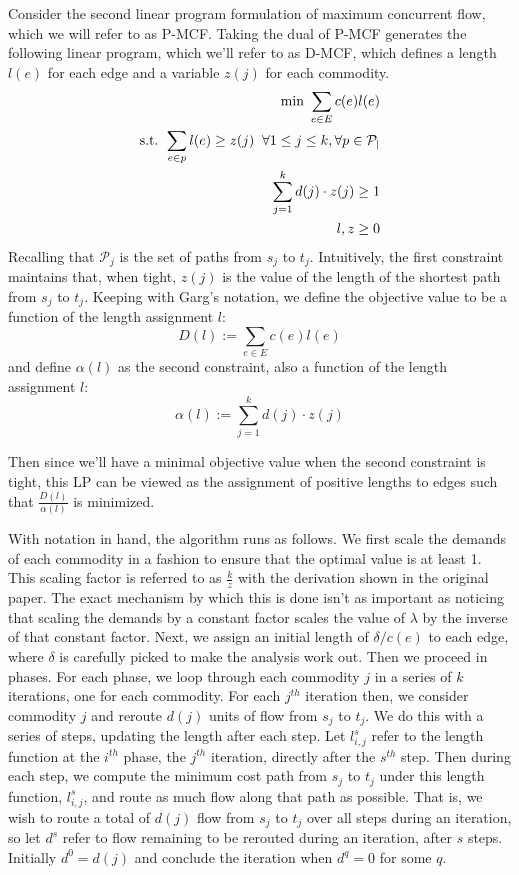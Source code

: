 Consider the second linear program formulation of maximum
concurrent flow, which we will refer to as P-MCF. Taking the dual of
P-MCF generates the following linear program, which we'll refer to as D-MCF, which defines a length
$l(e)$ for each edge and a variable $z(j)$ for each commodity.
\begin{align*}
\text{min     } \sum_{e\in E}c(e)l(e) \\
\text{s.t. }\sum_{e\in p}l(e) \geq z(j) \;\;\forall 1\leq j \leq k,
\forall p \in \cal{P}_j\\
\sum_{j=1}^kd(j)\cdot z(j)\geq 1\\
l,z\geq 0
\end{align*}
Recalling that $\mathcal{P}_j$ is the set of paths from $s_j$ to
$t_j$. Intuitively, the first constraint maintains that, when tight, $z(j)$ is the
value of the length of the shortest path from $s_j$ to $t_j$. Keeping
with Garg's notation, we define the objective value to be a function
of the length assignment $l$:
$$D(l) := \sum_{e\in E} c(e)l(e)$$
and define $\alpha(l)$ as the second constraint, also a function of the length assignment $l$:
$$\alpha(l) := \sum_{j=1}^k d(j)\cdot z(j)$$

Then since we'll have a minimal objective value when the second
constraint is tight, this LP can be viewed as the assignment of
positive lengths to edges such that $\frac{D(l)}{\alpha(l)}$ is
minimized. 

With notation in hand, the algorithm runs as follows. We first scale
the demands of each commodity in a fashion to ensure that the optimal
value is at least 1. This scaling factor is referred to as
$\frac{k}{z}$ with the derivation shown in the original paper. The exact mechanism by which this is done isn't
as important as noticing that scaling the demands by a constant factor
scales the value of $\lambda$ by the inverse of that constant
factor. Next, we assign
an initial length of $\delta/c(e)$ to each edge, where $\delta$ is carefully picked
to make the analysis work out. Then we proceed in phases. For each
phase, we loop through each commodity $j$ in a series of $k$
iterations, one for each commodity. For each $j^{th}$ iteration then, we
consider commodity $j$ and reroute $d(j)$ units of flow from $s_j$ to
$t_j$. We do this with a series of steps, updating the length after each step. Let $l_{i,j}^s$ refer to the
length function at the $i^{th}$ phase, the $j^{th}$ iteration,
directly after the $s^{th}$ step. Then during each step, we compute the minimum cost
path from $s_j$ to $t_j$ under this length function, $l_{i,j}^s$, and route as much
flow along that path as possible. That is, we wish to route a total of
$d(j)$ flow from $s_j$ to $t_j$ over all steps during an iteration, so
let $d^s$ refer to flow remaining to be rerouted during an
iteration, after $s$ steps. Initially $d^0=d(j)$ and conclude the
iteration when $d^q=0$ for some $q$. 

